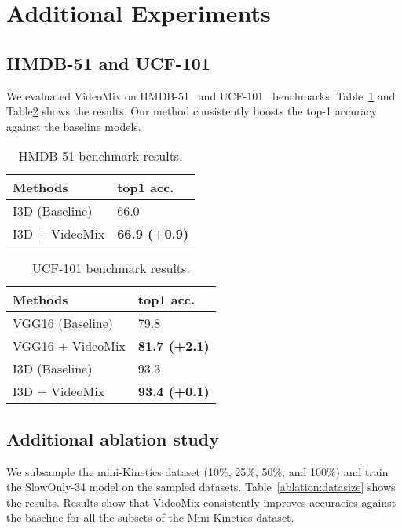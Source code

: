 \section{Additional Experiments}
\label{appendix:more_baseline}

\subsection{HMDB-51 and UCF-101}

We evaluated VideoMix on HMDB-51~\cite{kuehne2011hmdb} and UCF-101~\cite{soomro2012ucf101} benchmarks. Table~\ref{hmdb51} and Table\ref{ucf101} shows the results.
Our method consistently boosts the top-1 accuracy against the baseline models.

\begin{table}[h]
\centering
\begin{tabular}{@{}ll@{}}
\toprule
Methods              & top1 acc.  \\ \midrule
I3D (Baseline)	& 66.0 \\
I3D + VideoMix	&\textbf{66.9 (+0.9)}   \\ \midrule
\end{tabular}
\caption{HMDB-51 benchmark results.}
\label{hmdb51}
\end{table}

\begin{table}[h]
\centering
\begin{tabular}{@{}ll@{}}
\toprule
Methods              & top1 acc.   \\ \midrule
VGG16 (Baseline)	& 79.8 \\
VGG16 + VideoMix & \textbf{81.7 (+2.1)}\\ 
I3D (Baseline)	& 93.3 \\
I3D + VideoMix	& \textbf{93.4 (+0.1)} \\ \midrule
\end{tabular}
\caption{UCF-101 benchmark results.}
\label{ucf101}
\end{table}

\subsection{Additional ablation study}





We subsample the mini-Kinetics dataset (10$\%$, 25$\%$, 50$\%$, and 100$\%$) and train the SlowOnly-34 model on the sampled datasets. 
Table~\ref{ablation:datasize} shows the results. 
Results show that VideoMix consistently improves accuracies against the baseline for all the subsets of the Mini-Kinetics dataset.

